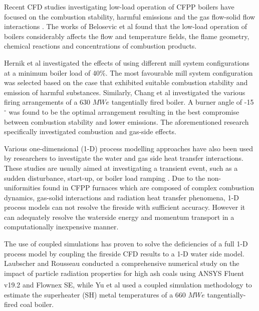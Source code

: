 \documentclass[11pt,cleanfoot]{asme2ej}
\begin{document}
Recent CFD studies investigating low-load operation of CFPP boilers have focused on the combustion stability, harmful emissions and the gas flow-solid flow interactions \cite{Jiang2021}. The works of Belosevic et al \cite{Belosevic2019a} found that the low-load operation of boilers considerably affects the flow and temperature fields, the flame geometry, chemical reactions and concentrations of combustion products.

Hernik et al \cite{Hernik2020} investigated the effects of using different mill system configurations at a minimum boiler load of 40\%. The most favourable mill system configuration was selected based on the case that exhibited suitable combustion stability and emission of harmful substances. Similarly, Chang et al \cite{Chang2021} investigated the various firing arrangements of a 630 $MWe$ tangentially fired boiler. A burner angle of -15 $^\circ$ was found to be the optimal arrangement resulting in the best compromise between combustion stability and lower emissions. The aforementioned research specifically investigated combustion and gas-side effects.

Various one-dimensional (1-D) process modelling approaches have also been used by researchers to investigate the water and gas side heat transfer interactions. These studies are usually aimed at investigating a transient event, such as a sudden disturbance, start-up, or boiler load ramping \cite{Alobaid2017}. Due to the non-uniformities found in CFPP furnaces which are composed of complex combustion dynamics, gas-solid interactions and  radiation heat transfer phenomena, 1-D process models can not resolve the fireside with sufficient accuracy. However it can adequately resolve the waterside energy and momentum transport in a computationally inexpensive manner.

The use of coupled simulations has proven to solve the deficiencies of a full 1-D process model by coupling the fireside CFD results to a 1-D water side model. Laubscher and Rousseau \cite{Laubscher2020} conducted a comprehensive numerical study on the impact of particle radiation properties for high ash coals using ANSYS Fluent v19.2\textsuperscript{\textregistered} and Flownex SE\textsuperscript{\textregistered}, while Yu et al \cite{Yu2019} used a coupled simulation methodology to estimate the superheater (SH) metal temperatures of a 660 $MWe$ tangentially-fired coal boiler.
\end{document}
